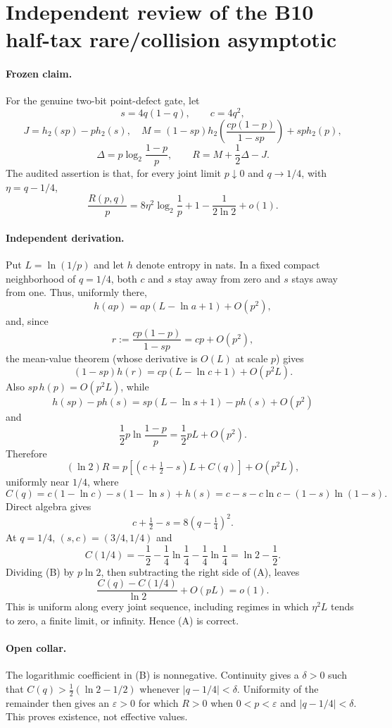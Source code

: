 \documentclass{article}
\begin{document}
\section*{Independent review of the B10 half-tax rare/collision asymptotic}

\paragraph{Frozen claim.}
For the genuine two-bit point-defect gate, let
\[
s=4q(1-q),\qquad c=4q^2,
\]
\[
J=h_2(sp)-p h_2(s),\quad
M=(1-sp)h_2\!\left(\frac{cp(1-p)}{1-sp}\right)+sp h_2(p),
\]
\[
\Delta=p\log_2\frac{1-p}{p},\qquad R=M+\frac12\Delta-J.
\]
The audited assertion is that, for every joint limit $p\downarrow0$ and
$q\to1/4$, with $\eta=q-1/4$,
\[
\frac{R(p,q)}p=8\eta^2\log_2\frac1p
+1-\frac1{2\ln2}+o(1).                                      \tag{A}
\]

\paragraph{Independent derivation.}
Put $L=\ln(1/p)$ and let $h$ denote entropy in nats.  In a fixed compact
neighborhood of $q=1/4$, both $c$ and $s$ stay away from zero and $s$ stays
away from one.  Thus, uniformly there,
\[
h(ap)=ap(L-\ln a+1)+O(p^2),
\]
and, since
\[
r:=\frac{cp(1-p)}{1-sp}=cp+O(p^2),
\]
the mean-value theorem (whose derivative is $O(L)$ at scale $p$) gives
\[
(1-sp)h(r)=cp(L-\ln c+1)+O(p^2L).
\]
Also $sp\,h(p)=O(p^2L)$, while
\[
h(sp)-p h(s)=sp(L-\ln s+1)-p h(s)+O(p^2)
\]
and
\[
\frac12p\ln\frac{1-p}{p}=\frac12pL+O(p^2).
\]
Therefore
\[
(\ln2)R=p\left[(c+\tfrac12-s)L+C(q)\right]+O(p^2L),             \tag{B}
\]
uniformly near $1/4$, where
\[
C(q)=c(1-\ln c)-s(1-\ln s)+h(s)
=c-s-c\ln c-(1-s)\ln(1-s).                                    \tag{C}
\]
Direct algebra gives
\[
c+\tfrac12-s=8(q-\tfrac14)^2.                                  \tag{D}
\]
At $q=1/4$, $(s,c)=(3/4,1/4)$ and
\[
C(1/4)=-\frac12-\frac14\ln\frac14-\frac14\ln\frac14
=\ln2-\frac12.                                                  \tag{E}
\]
Dividing (B) by $p\ln2$, then subtracting the right side of (A), leaves
\[
\frac{C(q)-C(1/4)}{\ln2}+O(pL)=o(1).
\]
This is uniform along every joint sequence, including regimes in which
$\eta^2L$ tends to zero, a finite limit, or infinity.  Hence (A) is correct.

\paragraph{Open collar.}
The logarithmic coefficient in (B) is nonnegative.  Continuity gives a
$\delta>0$ such that $C(q)>\tfrac12(\ln2-1/2)$ whenever
$|q-1/4|<\delta$.  Uniformity of the remainder then gives an
$\varepsilon>0$ for which $R>0$ when $0<p<\varepsilon$ and
$|q-1/4|<\delta$.  This proves existence, not effective values.
\end{document}
